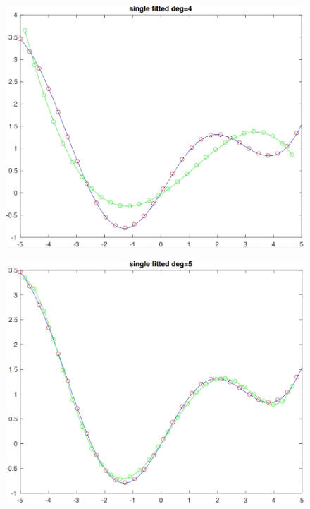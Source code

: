 \documentclass[11pt]{article}
\begin{document}
\begin{figure}[h!]
\centering\includegraphics[scale=0.3]{clean_poly_d_4.png}
\end{figure}


\begin{figure}[h!]
\centering\includegraphics[scale=0.3]{clean_poly_d_5.png}
\end{figure}
\end{document}
